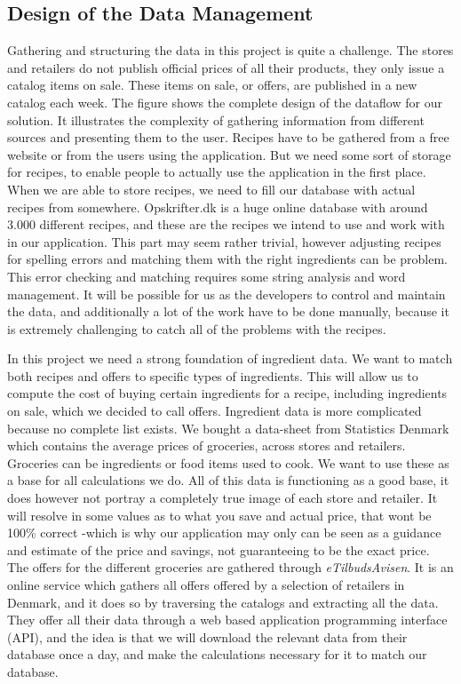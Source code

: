 \subsection{Design of the Data Management}\label{subsec:datamanagement}

Gathering and structuring the data in this project is quite a challenge. The stores and retailers do not publish official prices of all their products, they only issue a catalog items on sale. These items on sale, or offers, are published in a new catalog each week. The figure  shows the complete design of the dataflow for our solution. It illustrates the complexity of gathering information from different sources and presenting them to the user. Recipes have to be gathered from a free website or from the users using the application. But we need some sort of storage for recipes, to enable people to actually use the application in the first place. When we are able to store recipes, we need to fill our database with actual recipes from somewhere. Opskrifter.dk is a huge online database with around 3.000 different recipes, and these are the recipes we intend to use and work with in our application. This part may seem rather trivial, however adjusting recipes for spelling errors and matching them with the right ingredients can be problem. This error checking and matching requires some string analysis and word management. It will be possible for us as the developers to control and maintain the data, and additionally a lot of the work have to be done manually, because it is extremely challenging to catch all of the problems with the recipes.

In this project we need a strong foundation of ingredient data. We want to match both recipes and offers to specific types of ingredients. This will allow us to compute the cost of buying certain ingredients for a recipe, including ingredients on sale, which we decided to call offers. Ingredient data is more complicated because no complete list exists. We bought a data-sheet from Statistics Denmark which contains the average prices of groceries, across stores and retailers. Groceries can be ingredients or food items used to cook. We want to use these as a base for all calculations we do. All of this data is functioning as a good base, it does however not portray a completely true image of each store and retailer. It will resolve in some values as to what you save and actual price, that wont be 100\% correct -which is why our application may only can be seen as a guidance and estimate of the price and savings, not guaranteeing to be the exact price. The offers for the different groceries are gathered through \textit{eTilbudsAvisen}. It is an online service which gathers all offers offered by a selection of retailers in Denmark, and it does so by traversing the catalogs and extracting all the data. They offer all their data through a web based application programming interface (API), and the idea is that we will download the relevant data from their database once a day, and make the calculations necessary for it to match our database. 

